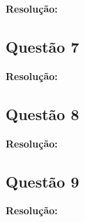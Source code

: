 \documentclass[12pt]{article}
\begin{document}
\textbf{Resolução:}

\subsection{Questão 7}
\label{subsec:p2q7}

\textbf{Resolução:}

\subsection{Questão 8}
\label{subsec:p2q8}

\textbf{Resolução:}

\subsection{Questão 9}
\label{subsec:p2q9}

\textbf{Resolução:} 
\end{document}
